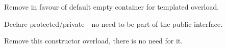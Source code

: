 \begin{DoxyRefList}
%
Remove in favour of default empty container for templated overload.  
\item[Member \mbox{\hyperlink{classstd_1_1matrix_ab90291f2d6281ce47546aece28720c94}{std\+::matrix\texorpdfstring{$<$}{<} T \texorpdfstring{$>$}{>}\+::row\+ID}} (size\+\_\+t row) const]\label{todo__todo000003}%
%
Declare protected/private -\/ no need to be part of the public interface.  
\item[Member \mbox{\hyperlink{classstd_1_1tagged_a0fe9b3a7a4392d31e0c8e19dc03a088d}{std\+::tagged\texorpdfstring{$<$}{<} T, Key \texorpdfstring{$>$}{>}\+::tagged}} (const T \&value\+\_\+, const key\+\_\+type \&key\+\_\+)]\label{todo__todo000010}%
%
Remove this constructor overload, there is no need for it. 
\end{DoxyRefList}